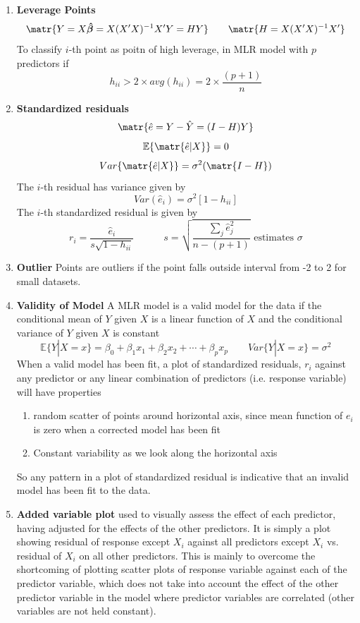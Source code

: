 \documentclass[11pt]{article}
\newcommand{\bbetahat}{\boldsymbol{\hat{\beta}}}
\newcommand{\e}[1]{\mathbb{E} \{#1\}}
\begin{document}
\begin{enumerate}
    \item \textbf{Leverage Points} 
    \[
        \matr{Y = X \bbetahat = X(X'X)^{-1}X'Y = HY} 
        \quad \quad 
        \matr{H = X(X'X)^{-1}X'}    
    \]
    To classify $i$-th point as poitn of high leverage, in MLR model with $p$ predictors if 
    \[
        h_{ii} > 2 \times avg(h_{ii}) = 2 \times \frac{(p+1)}{n}
    \]
    \item \textbf{Standardized residuals} 
    \[
        \matr{\hat{e} = Y - \hat{Y} = (I - H)Y}    
    \]
    \[
        \e{\matr{\hat{e} | X}} = 0
    \]
    \[
        Var\{ \matr{\hat{e} | X} \} = \sigma^2(\matr{I-H})
    \]
    The $i$-th residual has variance given by 
    \[
        Var(\hat{e}_i) = \sigma^2\left[ 1 - h_{ii} \right]    
    \]
    The $i$-th standardized residual is given by 
    \[
        r_i = \frac{\hat{e}_i}{s \sqrt{1 - h_{ii}}} 
        \quad \quad \quad 
        s = \sqrt{\frac{\sum_j \hat{e}_j^2 }{n - (p+1)}} \text{ estimates } \sigma
    \]
    \item \textbf{Outlier} Points are outliers if the point falls outside interval from -2 to 2 for small datasets. 
    \item \textbf{Validity of Model} A MLR model is a valid model for the data if the conditional mean of $Y$ given $X$ is a linear function of $X$ and the conditional variance of $Y$ given $X$ is constant 
    \[
        \e{Y | X = x} = \beta_0 + \beta_1 x_1 + \beta_2 x_2 + \cdots + \beta_p x_p 
        \quad \quad 
        Var\{ Y| X=x \} = \sigma^2
    \]
    When a valid model has been fit, a plot of standardized residuals, $r_i$ against any predictor or any linear combination of predictors (i.e. response variable) will have properties
    \begin{enumerate}
        \item random scatter of points around horizontal axis, since mean function of $e_i$ is zero when a corrected model has been fit 
        \item Constant variability as we look along the horizontal axis 
    \end{enumerate}
    So any pattern in a plot of standardized residual is indicative that an invalid model has been fit to the data. 
    \item \textbf{Added variable plot} used to visually assess the effect of each predictor, having adjusted for the effects of the other predictors. It is simply a plot showing residual of response except $X_i$ against all predictors except $X_i$ vs. residual of $X_i$ on all other  predictors. This is mainly to overcome the shortcoming of plotting scatter plots of response variable against each of the predictor variable, which does not take into account the effect of the other predictor variable in the model where predictor variables are correlated (other variables are not held constant).  

\end{enumerate}
\end{document}
